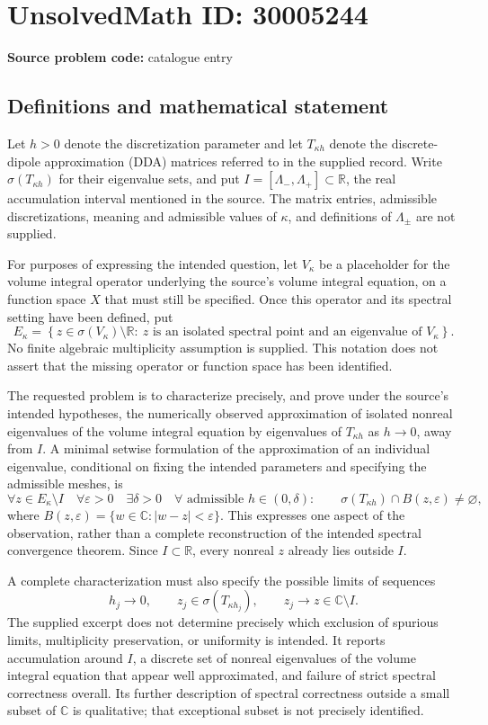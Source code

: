\documentclass[11pt]{article}
\newcommand{\R}{\mathbb{R}}
\newcommand{\C}{\mathbb{C}}
\begin{document}
\section*{UnsolvedMath ID: 30005244}
\textbf{Source problem code:} catalogue entry
\subsection{Definitions and mathematical statement}
Let \(h>0\) denote the discretization parameter and let \(T_{\kappa h}\) denote the discrete-dipole approximation (DDA) matrices referred to in the supplied record. Write \(\sigma(T_{\kappa h})\) for their eigenvalue sets, and put \(I=[\Lambda_-,\Lambda_+]\subset\R\), the real accumulation interval mentioned in the source. The matrix entries, admissible discretizations, meaning and admissible values of \(\kappa\), and definitions of \(\Lambda_\pm\) are not supplied.

For purposes of expressing the intended question, let \(V_\kappa\) be a placeholder for the volume integral operator underlying the source's volume integral equation, on a function space \(X\) that must still be specified. Once this operator and its spectral setting have been defined, put
\[
E_\kappa=\left\{z\in\sigma(V_\kappa)\setminus\R:\ z\text{ is an isolated spectral point and an eigenvalue of }V_\kappa\right\}.
\]
No finite algebraic multiplicity assumption is supplied. This notation does not assert that the missing operator or function space has been identified.

The requested problem is to characterize precisely, and prove under the source's intended hypotheses, the numerically observed approximation of isolated nonreal eigenvalues of the volume integral equation by eigenvalues of \(T_{\kappa h}\) as \(h\to0\), away from \(I\). A minimal setwise formulation of the approximation of an individual eigenvalue, conditional on fixing the intended parameters and specifying the admissible meshes, is
\[
\forall z\in E_\kappa\setminus I\quad
\forall\varepsilon>0\quad
\exists\delta>0\quad
\forall\text{ admissible }h\in(0,\delta):\qquad
\sigma(T_{\kappa h})\cap B(z,\varepsilon)\ne\varnothing,
\]
where \(B(z,\varepsilon)=\{w\in\C:|w-z|<\varepsilon\}\). This expresses one aspect of the observation, rather than a complete reconstruction of the intended spectral convergence theorem. Since \(I\subset\R\), every nonreal \(z\) already lies outside \(I\).

A complete characterization must also specify the possible limits of sequences
\[
h_j\to0,\qquad z_j\in\sigma(T_{\kappa h_j}),\qquad z_j\to z\in\C\setminus I.
\]
The supplied excerpt does not determine precisely which exclusion of spurious limits, multiplicity preservation, or uniformity is intended. It reports accumulation around \(I\), a discrete set of nonreal eigenvalues of the volume integral equation that appear well approximated, and failure of strict spectral correctness overall. Its further description of spectral correctness outside a small subset of \(\C\) is qualitative; that exceptional subset is not precisely identified.
\end{document}
